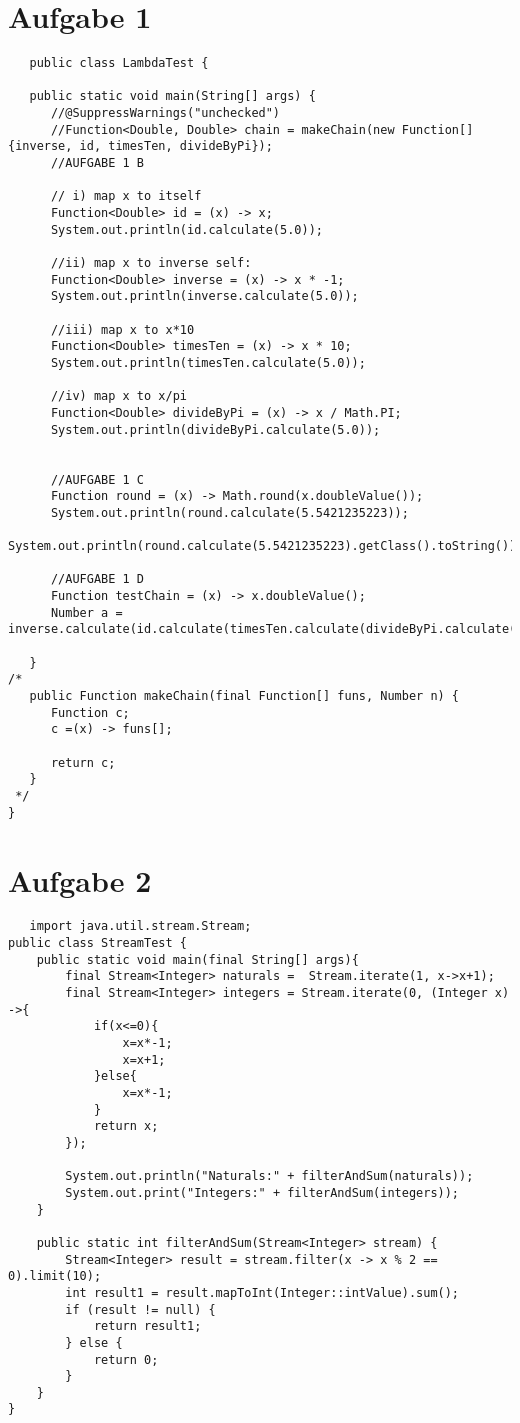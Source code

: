 \documentclass[12pt,a4paper,oneside,ngerman]{article}
\begin{document}

\section*{Aufgabe 1}
\begin{lstlisting}
   public class LambdaTest {

   public static void main(String[] args) {
      //@SuppressWarnings("unchecked")
      //Function<Double, Double> chain = makeChain(new Function[]{inverse, id, timesTen, divideByPi});
      //AUFGABE 1 B

      // i) map x to itself
      Function<Double> id = (x) -> x;
      System.out.println(id.calculate(5.0));

      //ii) map x to inverse self:
      Function<Double> inverse = (x) -> x * -1;
      System.out.println(inverse.calculate(5.0));

      //iii) map x to x*10
      Function<Double> timesTen = (x) -> x * 10;
      System.out.println(timesTen.calculate(5.0));

      //iv) map x to x/pi
      Function<Double> divideByPi = (x) -> x / Math.PI;
      System.out.println(divideByPi.calculate(5.0));


      //AUFGABE 1 C
      Function round = (x) -> Math.round(x.doubleValue());
      System.out.println(round.calculate(5.5421235223));
      System.out.println(round.calculate(5.5421235223).getClass().toString());

      //AUFGABE 1 D
      Function testChain = (x) -> x.doubleValue();
      Number a = inverse.calculate(id.calculate(timesTen.calculate(divideByPi.calculate(5.0))));

   }
/*
   public Function makeChain(final Function[] funs, Number n) {
      Function c;
      c =(x) -> funs[];

      return c;
   }
 */
}

\end{lstlisting}
\section*{Aufgabe 2}
\begin{lstlisting}
   import java.util.stream.Stream;
public class StreamTest {
    public static void main(final String[] args){
        final Stream<Integer> naturals =  Stream.iterate(1, x->x+1);
        final Stream<Integer> integers = Stream.iterate(0, (Integer x) ->{
            if(x<=0){
                x=x*-1;
                x=x+1;
            }else{
                x=x*-1;
            }
            return x;
        });
        
        System.out.println("Naturals:" + filterAndSum(naturals));
        System.out.print("Integers:" + filterAndSum(integers));
    }

    public static int filterAndSum(Stream<Integer> stream) {
        Stream<Integer> result = stream.filter(x -> x % 2 == 0).limit(10);
        int result1 = result.mapToInt(Integer::intValue).sum();
        if (result != null) {
            return result1;
        } else {
            return 0;
        }
    }
}
\end{lstlisting}
\end{document}
